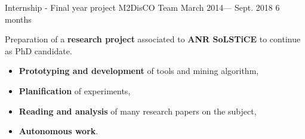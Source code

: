 \jobposition%
{Internship - Final year project}%
{M2DisCO Team}
{March 2014--- Sept. 2018}%
{6 months}%
{
	Preparation of a \textbf{research project} associated to \textbf{ANR SoLSTiCE}
	to continue as PhD candidate.
	\vspace{0.5em}
	\begin{itemize}
		\item \textbf{Prototyping and development} of tools and mining algorithm,
		\item \textbf{Planification} of experiments,
		\item \textbf{Reading and analysis} of many research papers on the subject,
		\item \textbf{Autonomous work}.
	\end{itemize}
	\vspace{0.5em}
}
